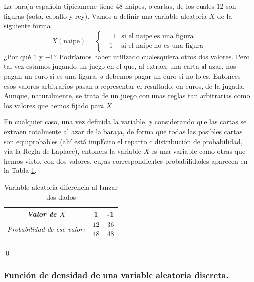 \begin{Ejemplo}\label{cap04:ejem:VariablesAleatoriasConFactorSubyacente}
    La baraja española típicamene tiene 48 naipes, o cartas, de los cuales 12 son figuras (sota, caballo y rey). Vamos a definir una variable aleatoria $X$ de la siguiente forma:
    \[
       X(\mbox{naipe})=\begin{cases}\phantom{-}1&\mbox{si el naipe es una figura}\\
       -1&\mbox{si el naipe no es una figura}
       \end{cases}
    \]
    ¿Por qué $1$ y $-1$? Podríamos haber utilizado cualesquiera otros dos valores. Pero tal vez estamos jugando un juego en el que, al extraer una carta al azar, nos pagan un euro si es una figura, o debemos pagar un euro si no lo es. Entonces esos valores arbitrarios pasan a representar el resultado, en euros, de la jugada. Aunque, naturalmente, se trata de un juego con unas reglas tan arbitrarias como los valores que hemos fijado para $X$.

    En cualquier caso, una vez definida la variable, y considerando que las cartas se extraen totalmente al azar de la baraja, de forma que todas las posibles cartas son equiprobables (ahí está implícito el reparto o distribución de probabilidad, vía la Regla de Laplace), entonces la variable $X$ es una variable como otras que hemos visto, con dos valores, cuyas correspondientes probabilidades aparecen en la Tabla \ref{cap04:tabla:VariableAleatoriaFiguraBarajaEspagnola}.
    \begin{table}[ht]
    \begin{center}
    \begin{tabular}[t]{|c|c|c|}
    \hline
    \rule{0cm}{0.5cm}{\em Valor de $X$}&1&-1\\
    \hline
    \rule{0cm}{0.7cm}{\em Probabilidad de ese valor:}&$\dfrac{12}{48}$&$\dfrac{36}{48}$\\
    &&\\
    \hline
    \end{tabular}
    \end{center}
    \caption{Variable aleatoria diferencia al lanzar dos dados}\label{cap04:tabla:VariableAleatoriaFiguraBarajaEspagnola}
    \end{table}
\qed
\end{Ejemplo}



\subsubsection*{Función de densidad de una variable aleatoria discreta.}
\label{cap04:subsubsec:FuncionDensidadVarAleatoriaDiscreta}

